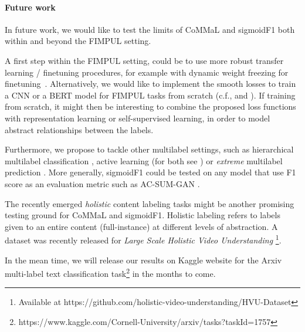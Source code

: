 



\paragraph{Future work}
In future work, we would like to test the limits of CoMMaL and sigmoidF1 both within and beyond the FIMPUL setting.


A first step within the FIMPUL setting, could be to use more robust transfer learning / finetuning procedures, for example with dynamic weight freezing for finetuning~\cite{ULMFit}. Alternatively, we would like to implement the smooth losses to train a CNN or a BERT model for FIMPUL tasks from scratch (c.f., \cite{tencent} and \cite{focalLoss}). If training from scratch, it might then be interesting to combine the proposed loss functions with representation learning \cite{unsupervisedImage,highResRepresentation} or self-supervised learning, in order to model abstract relationships between the labels.

Furthermore, we propose to tackle other multilabel settings, such as hierarchical multilabel classification \cite{HARAM},  active learning (for both see \cite{activeLearningMultiLabel}) or \emph{extreme} multilabel prediction \cite{extremeMultilabelText, extremeSIGIR} . More generally, sigmoidF1 could be tested on any model that use F1 score as an evaluation metric such as AC-SUM-GAN \cite{AC-SUM-GAN}.

The recently emerged \textit{holistic} content labeling tasks might be another promising testing ground for CoMMaL and sigmoidF1. Holistic labeling refers to labels given to an entire content (full-instance) at different levels of abstraction. A dataset was recently released for \emph{Large Scale Holistic Video Understanding} \cite{holisticVideoData}\footnote{Available at https://github.com/holistic-video-understanding/HVU-Dataset}.

\vspace{\baselineskip}

In the mean time, we will release our results on Kaggle website for the Arxiv multi-label text classification task\footnote{https://www.kaggle.com/Cornell-University/arxiv/tasks?taskId=1757} in the months to come.






